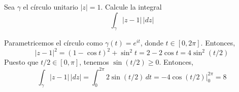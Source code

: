 \begin{exercise}
Sea $\gamma$ el círculo unitario $|z| = 1$. Calcule la integral
$$\int_\gamma |z-1| \, |dz|$$
\end{exercise}

\begin{solution}
Parametricemos el círculo como $\gamma(t) = e^{it}$, donde $t \in [0, 2\pi]$. Entonces,
$$|z-1|^2 = (1 - \cos t)^2 + \sin^2 t = 2 - 2 \cos t = 4 \sin^2 (t/2)$$
Puesto que $t/2 \in [0, \pi]$, tenemos $\sin (t/2) \ge 0$. Entonces,
$$\int_\gamma |z-1| \, |dz| = \int_0^{2\pi} 2 \sin (t/2) \, dt = -4 \cos (t/2) \Big \vert_0^{2\pi} = 8$$
\end{solution}
